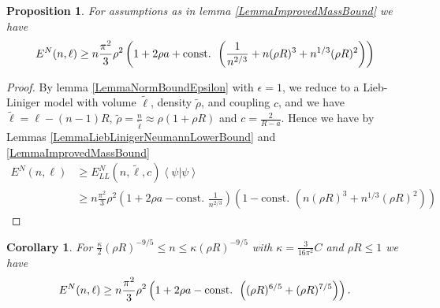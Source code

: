 \documentclass[a4paper,11pt]{article}
\renewcommand{\braket}[1]{\left\langle#1\right\rangle}
\newtheorem{proposition}[theorem]{Proposition}
\newtheorem{corollary}[theorem]{Corollary}
\numberwithin{equation}{section}
\begin{document}
	\begin{proposition}\label{PropositionLowerBoundSpecN}
		For assumptions as in lemma \ref{LemmaImprovedMassBound} we have \begin{equation}
		E^N(n,\ell)\geq n\frac{\pi^2}{3}\rho^2\left(1+2\rho a+\textnormal{const. }\left(\frac{1}{n^{2/3}}+n(\rho R)^3+n^{1/3}(\rho R)^2\right)\right)
		\end{equation}
	\end{proposition}
	\begin{proof}
		By lemma \ref{LemmaNormBoundEpsilon} with $ \epsilon=1 $, we reduce to a Lieb-Liniger model with volume $ \tilde{\ell} $, density $ \tilde{\rho} $, and coupling $ c $, and we have $ \tilde{\ell}=\ell-(n-1)R $, $ \tilde{\rho}=\frac{n}{\tilde{\ell}}\approx\rho (1+\rho R) $ and $ c=\frac{2}{R-a} $. Hence we have by Lemmas \ref{LemmaLiebLinigerNeumannLowerBound} and \ref{LemmaImprovedMassBound} \begin{equation}
		\begin{aligned}
		E^N(n,\ell)&\geq E_{LL}^N(n,\tilde{\ell},c)\braket{\psi|\psi}\\&\geq
		n\frac{\pi^2}{3}\rho^2\left(1+2\rho a-\text{const. }\frac{1}{n^{2/3}}\right)\left(1-\text{const. }\left(n(\rho R)^3+n^{1/3}(\rho R)^2\right)\right)
		\end{aligned}
		\end{equation}
	\end{proof}
	\begin{corollary} \label{CorollaryLowerBoundSpecN}
		For $ \frac{\kappa}{2} (\rho R)^{-9/5}\leq n\leq \kappa (\rho R)^{-9/5} $ with $ \kappa=\frac{3}{16\pi^2}C $ and $ \rho R\leq 1 $ we have 
		\begin{equation}
		E^N(n,\ell)\geq n\frac{\pi^2}{3}\rho^2\left(1+2\rho a-\textnormal{const. }\left((\rho R)^{6/5}+(\rho R)^{7/5}\right)\right).
		\end{equation}
	\end{corollary}
\end{document}
